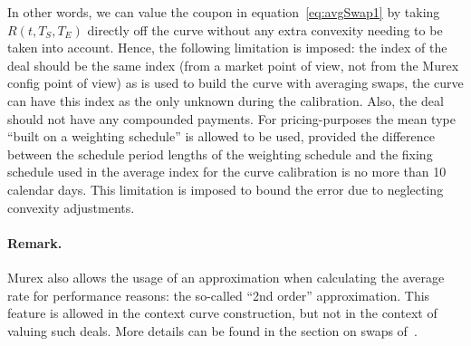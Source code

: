 \documentclass[]{pmv_report} %
\begin{document}
In other words, we can value the coupon in equation~\eqref{eq:avgSwap1} by taking $R(t,T_S,T_E)$ directly off the curve without any extra convexity needing to be taken into account.
Hence, the following limitation is imposed: the index of the deal should be the same index (from a market point of view, not from the Murex config point of view) as is used to build the curve with averaging swaps, the curve can have this index as the only unknown during the calibration.
Also, the deal should not have any compounded payments.
For pricing-purposes the mean type ``built on a weighting schedule'' is allowed to be used, provided the difference between the schedule period lengths of the weighting schedule and the fixing schedule used in the average index for the curve calibration is no more than 10 calendar days.
This limitation is imposed to bound the error due to neglecting convexity adjustments.

\paragraph{Remark.} Murex also allows the usage of an approximation when calculating the average rate for performance reasons: the so-called ``2nd order'' approximation.
This feature is allowed in the context curve construction, but not in the context of valuing such deals.
More details can be found in the section on swaps of~\cite{MxSettings.RateCurves}. \\
\end{document}
